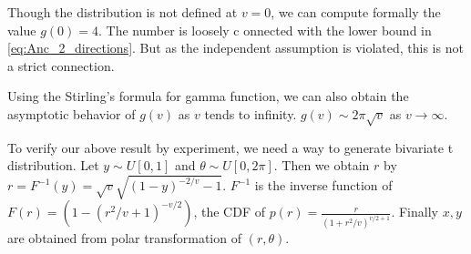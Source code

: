 \documentclass{article}
\begin{document}
Though the distribution is not defined at $v=0$,
we can compute formally the value $g(0)=4$.
The number is loosely c       onnected with the lower bound in \eqref{eq:Anc_2_directions}.
But as the independent assumption is violated, this is not
a strict connection.

Using the Stirling's formula for gamma function, we can also
obtain the asymptotic behavior of $g(v)$
as $v$ tends to infinity.
$g(v) \sim 2\pi \sqrt{v}$
as $v\to \infty$.

To verify our above result by experiment,
we need a way
to generate bivariate t distribution.
Let $y \sim U[0,1]$ and $\theta \sim
U[0, 2\pi]$. Then we obtain $r$
by $r=F^{-1}(y) = \sqrt{v}\sqrt{(1-y)^{-2/v}-1}$.
$F^{-1}$ is the inverse function
of $F(r)=
\left(1-(r^2/v+1)^{-v/2}
\right)$, the CDF of
$p(r)= 
\frac{r}{(1+r^2/v)^{v/2 + 1}}$.
Finally $x,y$ are obtained from polar transformation
of $(r,\theta)$.
\end{document}
